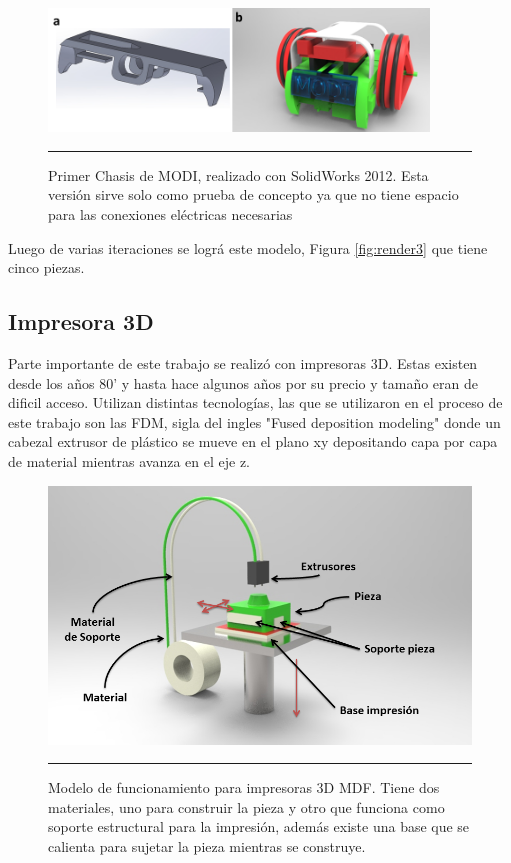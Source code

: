 \begin{figure}[htbp]
	\centering
		\includegraphics[width=0.9\textwidth]{./Figures/MODI/compRender.png}
		\rule{35em}{0.5pt}
	\caption[ModiSolidWorks]{Primer Chasis de MODI, realizado con SolidWorks 2012. Esta versión sirve solo como prueba de concepto ya que no tiene espacio para las conexiones eléctricas necesarias}
	\label{fig:MODISolidWork}
\end{figure}	

Luego de varias iteraciones se lográ este modelo, Figura \ref{fig:render3} que tiene cinco piezas. 



\subsection{Impresora 3D} \label{cap:impresora3D}

Parte importante de este trabajo se realizó con impresoras 3D. Estas existen desde los años 80' y hasta hace algunos años por su precio y tamaño eran de dificil acceso. Utilizan distintas tecnologías, las que se utilizaron en el proceso de este trabajo son las FDM, sigla del ingles "Fused deposition modeling" donde un cabezal extrusor de plástico se mueve en el plano xy depositando capa por capa de material mientras avanza en el eje z.

\begin{figure}[htbp]
	\centering
		\includegraphics[width=\textwidth]{./Figures/3Dprint.png}
		\rule{35em}{0.5pt}
	\caption[3Dprint]{Modelo de funcionamiento para impresoras 3D MDF. Tiene dos materiales, uno para construir la pieza y otro que funciona como soporte estructural para la impresión, además existe una base que se calienta para sujetar la pieza mientras se construye.}
	\label{fig:3Dprint}
\end{figure}	

